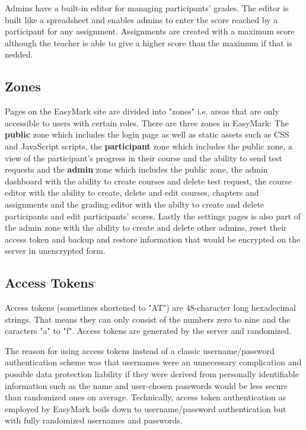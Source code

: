\documentclass[12pt,a4paper,oneside]{report}
\begin{document}
	\pagebreak
	Admins have a built-in editor for managing participants' grades. The editor is built like a spreadsheet and enables admins to enter the score reached by a participant for any assignment. Assignments are created with a maximum score although the teacher is able to give a higher score than the maximum if that is nedded.

	\subsection{Zones}
	Pages on the EasyMark site are divided into "zones" i.e. areas that are only accessible to users with certain roles. There are three zones in EasyMark: The \textbf{public} zone which includes the login page as well as static assets such as CSS and JavaScript scripts, the \textbf{participant} zone which includes the public zone, a view of the participant's progress in their course and the ability to send test requests and the \textbf{admin} zone which includes the public zone, the admin dashboard with the ability to create courses and delete test request, the course editor with the ability to create, delete and edit courses, chapters and assignments and the grading editor with the abilty to create and delete participants and edit participants' scores. Lastly the settings pages is also part of the admin zone with the ability to create and delete other admins, reset their access token and backup and restore information that would be encrypted on the server in unencrypted form.

	\subsection{Access Tokens} \label{subsec:accesstokens}
	Access tokens (sometimes shortened to "AT") are 48-character long hexadecimal strings. That means they can only consist of the numbers zero to nine and the caracters "a" to "f". Access tokens are generated by the server and randomized.

	The reason for using access tokens instead of a classic username/password authentication scheme was that usernames were an unnecessary complication and possible data protection liability if they were derived from personally identifiable information such as the name and user-chosen passwords would be less secure than randomized ones on average. Technically, access token authentication as employed by EasyMark boils down to username/password authentication but with fully randomized usernames and passwords.
\end{document}
